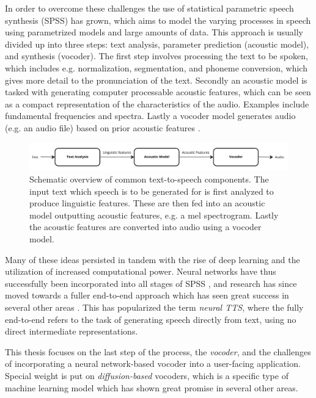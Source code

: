 \documentclass{article}
\begin{document}
In order to overcome these challenges the use of statistical parametric speech synthesis (SPSS) has grown, which aims to model the varying processes in speech using parametrized models and large amounts of data. This approach is usually divided up into three steps: text analysis, parameter prediction (acoustic model), and synthesis (vocoder). The first step involves processing the text to be spoken, which includes e.g. normalization, segmentation, and phoneme conversion, which gives more detail to the pronunciation of the text. Secondly an acoustic model is tasked with generating computer processable acoustic features, which can be seen as a compact representation of the characteristics of the audio. Examples include fundamental frequencies and spectra. Lastly a vocoder model generates audio (e.g. an audio file) based on prior acoustic features \cite{zen2009statistical, tan2021survey}. 
\begin{figure}[H]
    \centering
    \includegraphics[scale=0.07]{images/TTS.jpeg}
    \caption{\onehalfspacing Schematic overview of common text-to-speech components. The input text which speech is to be generated for is first analyzed to produce linguistic features. These are then fed into an acoustic model outputting acoustic features, e.g. a mel spectrogram. Lastly the acoustic features are converted into audio using a vocoder model.}
    \label{fig:TTS}
\end{figure}
Many of these ideas persisted in tandem with the rise of deep learning and the utilization of increased computational power. Neural networks have thus successfully been incorporated into all stages of SPSS \cite{ze2013statistical, arik2017deep}, and research has since moved towards a fuller end-to-end approach \cite{oord2016wavenet} which has seen great success in several other areas  \cite{krizhevsky2017imagenet, bojarski2016end, zhou2018voxelnet}. This has popularized the term \textit{neural TTS}, where the fully end-to-end refers to the task of generating speech directly from text, using no direct intermediate representations.

This thesis focuses on the last step of the process, the \textit{vocoder}, and the challenges of incorporating a neural network-based vocoder into a user-facing application. Special weight is put on \textit{diffusion-based} vocoders, which is a specific type of machine learning model which has shown great promise in several other areas. 
\end{document}
